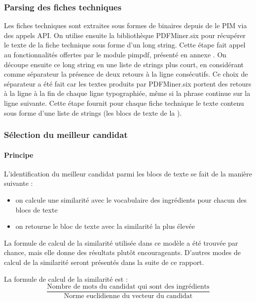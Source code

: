             \subsubsection{Parsing des fiches techniques}

                Les fiches techniques sont extraites sous formes de binaires depuis de le PIM via des appels API.
                On utilise ensuite la bibliothèque PDFMiner.six pour récupérer le texte de la fiche technique sous forme d'un long string.
                Cette étape fait appel au fonctionnalités offertes par le module pimpdf, présenté en annexe .
                On découpe ensuite ce long string en une liste de strings plus court, en considérant comme séparateur la présence de deux retours à la ligne consécutifs.
                Ce choix de séparateur a été fait car les textes produits par PDFMiner.six portent des retours à la ligne à la fin de chaque ligne typographiée, même si la phrase continue sur la ligne suivante.
                Cette étape fournit pour chaque fiche technique le texte contenu sous forme d'une liste de strings (les blocs de texte de la ).

            \subsubsection{Sélection du meilleur candidat}
            \label{open_model_similarity}

                \paragraph{Principe}
                L'identification du meilleur candidat parmi les blocs de texte se fait de la manière suivante :
                \begin{itemize}
                    \item on calcule une similarité avec le vocabulaire des ingrédients pour chacun des blocs de texte
                    \item on retourne le bloc de texte avec la similarité la plus élevée
                \end{itemize}
                La formule de calcul de la similarité utilisée dans ce modèle a été trouvée par chance, mais elle donne des résultats plutôt encourageants.
                D'autres modes de calcul de la similarité seront présentés dans la suite de ce rapport.

                La formule de calcul de la similarité est :
                \[\frac{\text{Nombre de mots du candidat qui sont des ingrédients}}{\text{Norme euclidienne du vecteur du candidat}}\]
                
